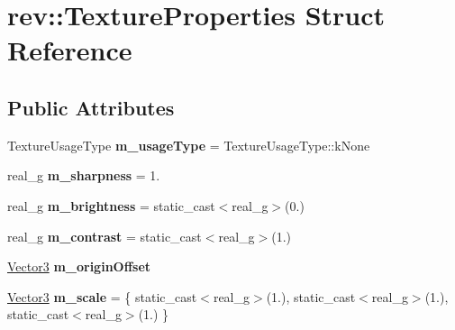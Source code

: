 \hypertarget{structrev_1_1_texture_properties}{}\section{rev\+::Texture\+Properties Struct Reference}
\label{structrev_1_1_texture_properties}
\subsection*{Public Attributes}
\begin{DoxyCompactItemize}
\item 
\mbox{\label{structrev_1_1_texture_properties_ac8d50477101c47bfe7e22f5bf724334b}} 
Texture\+Usage\+Type {\bfseries m\+\_\+usage\+Type} = Texture\+Usage\+Type\+::k\+None
\item 
\mbox{\label{structrev_1_1_texture_properties_a1e3184da14ae86c5015867c875797abc}} 
real\+\_\+g {\bfseries m\+\_\+sharpness} = 1.
\item 
\mbox{\label{structrev_1_1_texture_properties_ab5b93cac8bd5114d94c34f5948c7c788}} 
real\+\_\+g {\bfseries m\+\_\+brightness} = static\+\_\+cast$<$real\+\_\+g$>$(0.)
\item 
\mbox{\label{structrev_1_1_texture_properties_aa7be88c4ce94a104f01dd01abcec39c4}} 
real\+\_\+g {\bfseries m\+\_\+contrast} = static\+\_\+cast$<$real\+\_\+g$>$(1.)
\item 
\mbox{\label{structrev_1_1_texture_properties_a8732727ca918c5f5067156a031758f44}} 
\mbox{\hyperlink{classrev_1_1_vector}{Vector3}} {\bfseries m\+\_\+origin\+Offset}
\item 
\mbox{\label{structrev_1_1_texture_properties_a6bdd5aaf0fc4e79b86882f3a4a158a29}} 
\mbox{\hyperlink{classrev_1_1_vector}{Vector3}} {\bfseries m\+\_\+scale} = \{ static\+\_\+cast$<$real\+\_\+g$>$(1.), static\+\_\+cast$<$real\+\_\+g$>$(1.), static\+\_\+cast$<$real\+\_\+g$>$(1.) \}
\item 
\mbox{\label{structrev_1_1_texture_properties_a9b321aae3c10c771f5f20d83a4346894}} 

\end{DoxyCompactItemize}
